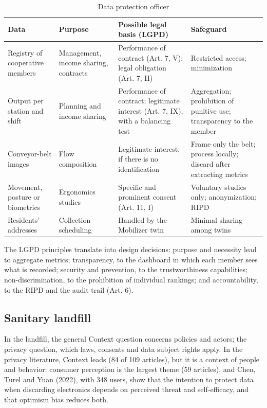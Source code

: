 \documentclass[12pt,a4paper,article,oneside,brazil,english]{abntex2}
\newcommand{\fontetab}[1]{\par\vspace{3pt}{\small\noindent Source: #1\par}}
\begin{document}
\begin{table}[!htbp]
\centering
\caption{Data protection officer}
\label{tab:encarregado}
\footnotesize
\begin{tabularx}{\linewidth}{>{\raggedright\arraybackslash}p{2.7cm} >{\raggedright\arraybackslash}p{2.4cm} Y Y}
\hline
\textbf{Data} & \textbf{Purpose} & \textbf{Possible legal basis (LGPD)} & \textbf{Safeguard}\\
\hline
Registry of cooperative members & Management, income sharing, contracts & Performance of contract (Art. 7, V); legal obligation (Art. 7, II) & Restricted access; minimization\\
Output per station and shift & Planning and income sharing & Performance of contract; legitimate interest (Art. 7, IX), with a balancing test & Aggregation; prohibition of punitive use; transparency to the member\\
Conveyor-belt images & Flow composition & Legitimate interest, if there is no identification & Frame only the belt; process locally; discard after extracting metrics\\
Movement, posture or biometrics & Ergonomics studies & Specific and prominent consent (Art. 11, I) & Voluntary studies only; anonymization; RIPD\\
Residents' addresses & Collection scheduling & Handled by the Mobilizer twin & Minimal sharing among twins\\
\hline
\end{tabularx}
\fontetab{Prepared by the author (2026).}
\end{table}

The LGPD principles translate into design decisions: purpose and necessity lead to aggregate metrics; transparency, to the dashboard in which each member sees what is recorded; security and prevention, to the trustworthiness capabilities; non-discrimination, to the prohibition of individual rankings; and accountability, to the RIPD and the audit trail (Art. 6).

\subsection{Sanitary landfill}

In the landfill, the general Context question concerns policies and actors; the privacy question, which laws, consents and data subject rights apply. In the privacy literature, Context leads (84 of 109 articles), but it is a context of people and behavior: consumer perception is the largest theme (59 articles), and Chen, Turel and Yuan (2022), with 348 users, show that the intention to protect data when discarding electronics depends on perceived threat and self-efficacy, and that optimism bias reduces both.
\end{document}
